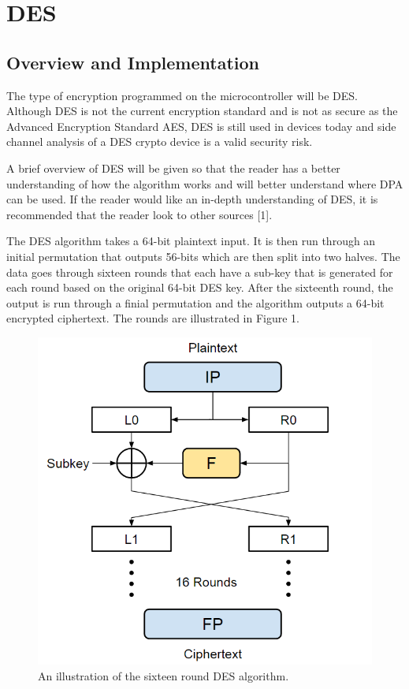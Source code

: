 \documentclass[letterpaper, 10 pt, conference]{ieeeconf}  %
\begin{document}
\section{DES}

\subsection{Overview and Implementation}

The type of encryption programmed on the microcontroller will be DES.  Although DES is not the current encryption standard and is not as secure as the Advanced Encryption Standard AES, DES is still used in devices today and side channel analysis of a DES crypto device is a valid security risk.

A brief overview of DES will be given so that the reader has a better understanding of how the algorithm works and will better understand where DPA can be used.  If the reader would like an in-depth understanding of DES, it is recommended that the reader look to other sources [1].

The DES algorithm takes a 64-bit plaintext input.  It is then run through an initial permutation that outputs 56-bits which are then split into two halves.  The data goes through sixteen rounds that each have a sub-key that is generated for each round based on the original 64-bit DES key.  After the sixteenth round, the output is run through a finial permutation and the algorithm outputs a 64-bit encrypted ciphertext.  The rounds are illustrated in Figure 1.

\begin{figure}[thpb]
	\centering
	\includegraphics[scale=.50]{DesRounds}
    \caption{An illustration of the sixteen round DES algorithm.}
\end{figure}
\end{document}
